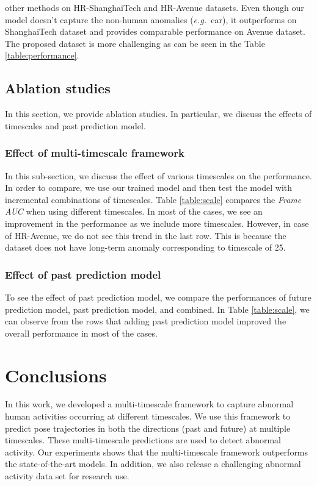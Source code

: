 \documentclass[conference]{IEEEtran}
\def\eg{\emph{e.g.~}}
\begin{document}
other methods on HR-ShanghaiTech and HR-Avenue datasets. Even though our model doesn't capture the non-human anomalies (\eg car), it outperforms on ShanghaiTech dataset and provides comparable performance on Avenue dataset. The proposed dataset is more challenging as can be seen in the Table \ref{table:performance}.  

\subsection{Ablation studies}
In this section, we provide ablation studies. In particular, we discuss the effects of timescales and past prediction model.
\subsubsection{Effect of multi-timescale framework}
In this sub-section, we discuss the effect of various timescales on the performance. In order to compare, we use our trained model and then test the model with incremental combinations of timescales. Table \ref{table:scale} compares the \textit{Frame AUC} when using different timescales. In most of the cases, we see an improvement in the performance as we include more timescales. However, in case of HR-Avenue, we do not see this trend in the last row. This is because the dataset does not have long-term anomaly corresponding to timescale of 25. 

 \subsubsection{Effect of past prediction model}
To see the effect of past prediction model, we compare the performances of future prediction model, past prediction model, and combined. In Table \ref{table:scale}, we can observe from the rows that adding past prediction model improved the overall performance in most of the cases.    



\section{Conclusions}
\label{con}
In this work, we developed a multi-timescale framework to capture abnormal human activities occurring at different timescales. We use this framework to predict pose trajectories in both the directions (past and future) at multiple timescales. These multi-timescale predictions are used to detect abnormal activity. Our experiments shows that the multi-timescale framework outperforms the state-of-the-art models. In addition, we also release a challenging abnormal activity data set for research use. 

{\small


}
\end{document}
